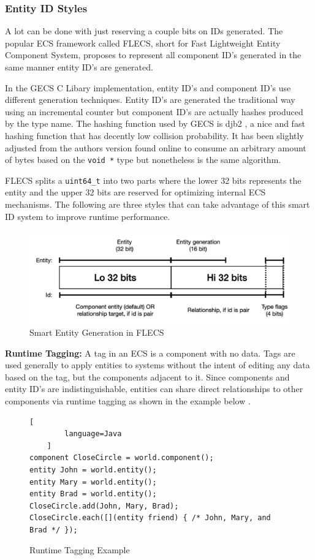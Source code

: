 \subsubsection{Entity ID Styles}
A lot can be done with just reserving a couple bits on IDs generated. The popular ECS framework called FLECS, short for Fast Lightweight Entity Component System, proposes to represent all component ID's generated in the same manner entity ID's are generated. 

In the GECS C Libary implementation, entity ID's and component ID's use different generation techniques. Entity ID's are generated the traditional way using an incremental counter but component ID's are actually hashes produced by the type name. The hashing function used by GECS is djb2 \cite{hashing}, a nice and fast hashing function that has decently low collision probability. It has been slightly adjusted from the authors version found online to consume an arbitrary amount of bytes based on the \texttt{void *} type but nonetheless is the same algorithm. 

FLECS splits a \texttt{uint64\_t} into two parts where the lower 32 bits represents the entity and the upper 32 bits are reserved for optimizing internal ECS mechanisms. The following are three styles that can take advantage of this smart ID system to improve runtime performance.

\begin{figure}[H]
    \centering
    \includegraphics[width=0.5\linewidth]{resources/entity_generation.png}
    \caption{Smart Entity Generation in FLECS}
    \label{fig:entity_generation}
\end{figure}

\textbf{Runtime Tagging:}
A tag in an ECS is a component with no data. Tags are used generally to apply entities to systems without the intent of editing any data based on the tag, but the components adjacent to it. Since components and entity ID's are indistinguishable, entities can share direct relationships to other components via runtime tagging as shown in the example below \cite{RomeoPHD}.

\begin{figure}[H]
    \begin{lstlisting}[
        language=Java
    ]
component CloseCircle = world.component();
entity John = world.entity();
entity Mary = world.entity();
entity Brad = world.entity();
CloseCircle.add(John, Mary, Brad);
CloseCircle.each([](entity friend) { /* John, Mary, and Brad */ });
\end{lstlisting}
    \caption{Runtime Tagging Example}
    \label{code:runtime_tagging}
\end{figure}

